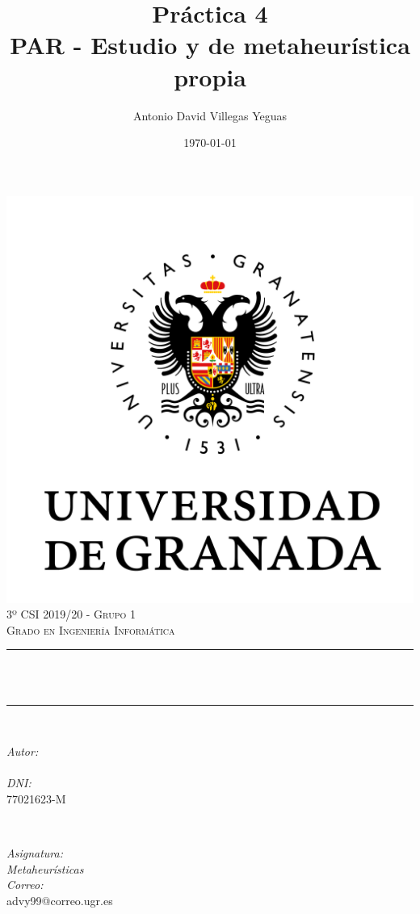 \documentclass[12pt, spanish]{article}
\title{Práctica 4\\
PAR - Estudio y de metaheurística propia  \hspace{0.05cm} }
\author{Antonio David Villegas Yeguas}
\date{\today}
\makeatletter
\let\thetitle\@title
\let\theauthor\@author
\makeatother
\begin{document}

\begin{titlepage}
    \centering
    \vspace*{0.3 cm}
    \includegraphics[scale = 0.50]{ugr.png}\\[0.7 cm]
    \textsc{\large 3º CSI 2019/20 - Grupo 1}\\[0.5 cm]
    \textsc{\large Grado en Ingeniería Informática}\\[0.5 cm]
    \rule{\linewidth}{0.2 mm} \\[0.2 cm]
    { \huge \bfseries \thetitle}\\
    \rule{\linewidth}{0.2 mm} \\[1 cm]

    \begin{minipage}{0.4\textwidth}
        \begin{flushleft} \large
            \emph{Autor:}\\
            \theauthor\\
			 \emph{DNI:}\\
            77021623-M
            \end{flushleft}
            \end{minipage}~
            \begin{minipage}{0.4\textwidth}
            \begin{flushright} \large
            \emph{Asignatura: \\
            Metaheurísticas}   \\
            \emph{Correo:}\\
            advy99@correo.ugr.es
        \end{flushright}
    \end{minipage}\\[0.5cm]


\end{titlepage}
\end{document}
